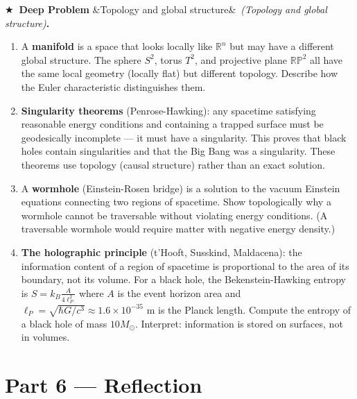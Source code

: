 \documentclass[12pt,a4paper]{article}
\newcounter{problem}
\newcounter{deepproblem}
\newenvironment{deepproblem}[1][]{\refstepcounter{deepproblem}\par\vspace{6pt}\noindent\textbf{\color{NavyBlue}$\bigstar$\ Deep Problem \thedeepproblem}\ifx&#1&\else\ \textit{(#1)}\fi\textbf{.}\enskip}{\par\vspace{4pt}}
\begin{document}
\begin{deepproblem}[Topology and global structure]
\begin{enumerate}[label=(\alph*)]
  \item A \textbf{manifold} is a space that looks locally like $\mathbb{R}^n$ but may have a different global structure. The sphere $S^2$, torus $T^2$, and projective plane $\mathbb{RP}^2$ all have the same local geometry (locally flat) but different topology. Describe how the Euler characteristic distinguishes them.
  \item \textbf{Singularity theorems} (Penrose-Hawking): any spacetime satisfying reasonable energy conditions and containing a trapped surface must be geodesically incomplete --- it must have a singularity. This proves that black holes contain singularities and that the Big Bang was a singularity. These theorems use topology (causal structure) rather than an exact solution.
  \item A \textbf{wormhole} (Einstein-Rosen bridge) is a solution to the vacuum Einstein equations connecting two regions of spacetime. Show topologically why a wormhole cannot be traversable without violating energy conditions. (A traversable wormhole would require matter with negative energy density.)
  \item \textbf{The holographic principle} (t'Hooft, Susskind, Maldacena): the information content of a region of spacetime is proportional to the area of its boundary, not its volume. For a black hole, the Bekenstein-Hawking entropy is $S = k_B\frac{A}{4\ell_P^2}$ where $A$ is the event horizon area and $\ell_P = \sqrt{\hbar G/c^3}\approx 1.6\times 10^{-35}$ m is the Planck length. Compute the entropy of a black hole of mass $10M_\odot$. Interpret: information is stored on surfaces, not in volumes.
\end{enumerate}
\end{deepproblem}

\section{Part 6 \texorpdfstring{---}{--} Reflection}
\end{document}

